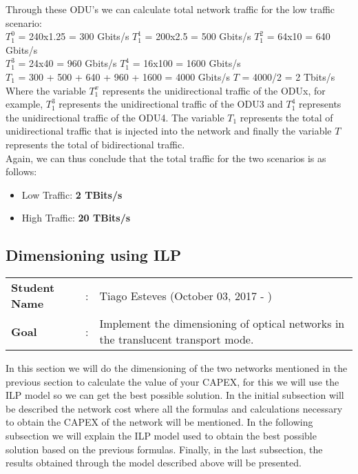 Through these ODU's we can calculate total network traffic for the low traffic scenario:\\

$T_1^0$ = 240x1.25 = 300 Gbits/s \qquad
$T_1^1$ = 200x2.5 = 500 Gbits/s \qquad
$T_1^2$ = 64x10 = 640 Gbits/s \\

$T_1^3$ = 24x40 = 960 Gbits/s \quad
$T_1^4$ = 16x100 = 1600 Gbits/s \\

$T_{1}$ = 300 + 500 + 640 + 960 + 1600 = 4000 Gbits/s \qquad
$T$ = 4000/2 = 2 Tbits/s\\

Where the variable $T_1^x$ represents the unidirectional traffic of the ODUx, for example, $T_1^3$ represents the unidirectional traffic of the ODU3 and $T_1^4$ represents the unidirectional traffic of the ODU4. The variable $T_{1}$ represents the total of unidirectional traffic that is injected into the network and finally the variable $T$ represents the total of bidirectional traffic.\\

Again, we can thus conclude that the total traffic for the two scenarios is as follows:
\begin{itemize}
  \item Low Traffic: \textbf{2 TBits/s}
  \item High Traffic: \textbf{20 TBits/s}
\end{itemize}


\subsection{Dimensioning using ILP}
\begin{tcolorbox}	
\begin{tabular}{p{2.75cm} p{0.2cm} p{10.5cm}} 	
\textbf{Student Name}  &:& Tiago Esteves    (October 03, 2017 - )\\
\textbf{Goal}          &:& Implement the dimensioning of optical networks in the translucent transport mode.
\end{tabular}
\end{tcolorbox}

\vspace{11pt}

In this section we will do the dimensioning of the two networks mentioned in the previous section to calculate the value of your CAPEX, for this we will use the ILP model so we can get the best possible solution.
In the initial subsection will be described the network cost where all the formulas and calculations necessary to obtain the CAPEX of the network will be mentioned.
In the following subsection we will explain the ILP model used to obtain the best possible solution based on the previous formulas.
Finally, in the last subsection, the results obtained through the model described above will be presented.

